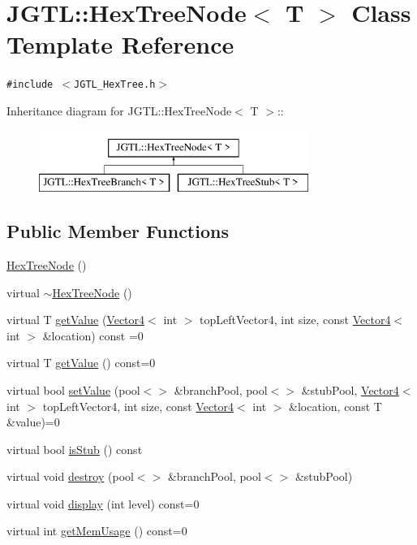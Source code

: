 \hypertarget{class_j_g_t_l_1_1_hex_tree_node}{
\section{JGTL::Hex\-Tree\-Node$<$ T $>$ Class Template Reference}
\label{class_j_g_t_l_1_1_hex_tree_node}
}
{\tt \#include $<$JGTL\_\-Hex\-Tree.h$>$}

Inheritance diagram for JGTL::Hex\-Tree\-Node$<$ T $>$::\begin{figure}[H]
\begin{center}
\leavevmode
\includegraphics[height=2cm]{class_j_g_t_l_1_1_hex_tree_node}
\end{center}
\end{figure}
\subsection*{Public Member Functions}
\begin{CompactItemize}
\item 
\hyperlink{class_j_g_t_l_1_1_hex_tree_node_564ae11ac8eac7662e7fac5fc8c49f57}{Hex\-Tree\-Node} ()
\item 
virtual \hyperlink{class_j_g_t_l_1_1_hex_tree_node_274897364d0457a85e4efcc0ea9de0c4}{$\sim$Hex\-Tree\-Node} ()
\item 
virtual T \hyperlink{class_j_g_t_l_1_1_hex_tree_node_64532266729bda54b7473acde6714604}{get\-Value} (\hyperlink{class_j_g_t_l_1_1_vector4}{Vector4}$<$ int $>$ top\-Left\-Vector4, int size, const \hyperlink{class_j_g_t_l_1_1_vector4}{Vector4}$<$ int $>$ \&location) const =0
\item 
virtual T \hyperlink{class_j_g_t_l_1_1_hex_tree_node_81dc320d9ae3cce6b5043696fa70a36d}{get\-Value} () const=0
\item 
virtual bool \hyperlink{class_j_g_t_l_1_1_hex_tree_node_a65570f2ecf17f3537a8a726795b4152}{set\-Value} (pool$<$$>$ \&branch\-Pool, pool$<$$>$ \&stub\-Pool, \hyperlink{class_j_g_t_l_1_1_vector4}{Vector4}$<$ int $>$ top\-Left\-Vector4, int size, const \hyperlink{class_j_g_t_l_1_1_vector4}{Vector4}$<$ int $>$ \&location, const T \&value)=0
\item 
virtual bool \hyperlink{class_j_g_t_l_1_1_hex_tree_node_4d37c24c8c3830953d2a9f195d7d26b5}{is\-Stub} () const
\item 
virtual void \hyperlink{class_j_g_t_l_1_1_hex_tree_node_f093e463c1b3247b587370802caa98f2}{destroy} (pool$<$$>$ \&branch\-Pool, pool$<$$>$ \&stub\-Pool)
\item 
virtual void \hyperlink{class_j_g_t_l_1_1_hex_tree_node_2031e26f8fbf11d061e51cdd0a6c27eb}{display} (int level) const=0
\item 
virtual int \hyperlink{class_j_g_t_l_1_1_hex_tree_node_9d71c1520ef1d80cf8ff292710e1994d}{get\-Mem\-Usage} () const=0
\end{CompactItemize}
